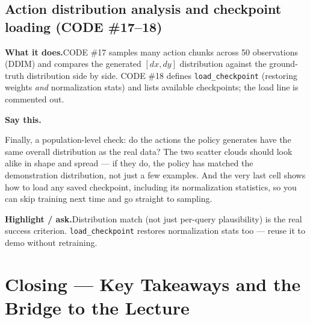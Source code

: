 \documentclass[11pt]{article}
\newenvironment{saythis}{%
  \par\smallskip\noindent
  \begin{list}{}{%
    \setlength{\leftmargin}{1.2em}%
    \setlength{\rightmargin}{0.5em}%
    \setlength{\topsep}{2pt}%
  }\item\relax
  \color{sayrule}\textbf{Say this.}\hspace{0.4em}\color{black}\itshape
}{%
  \end{list}\par\smallskip
}
\newcommand{\highlight}[1]{\par\smallskip\noindent\textcolor{hlcolor}{\textbf{Highlight / ask.}}\hspace{0.4em}#1\par\smallskip}
\newcommand{\whatdoes}[1]{\par\noindent\textbf{What it does.}\hspace{0.4em}#1\par}
\begin{document}
\subsection{Action distribution analysis and checkpoint loading (CODE \#17--18)}
\whatdoes{CODE \#17 samples many action chunks across 50 observations (DDIM) and compares the generated
$[dx,dy]$ distribution against the ground-truth distribution side by side. CODE \#18 defines
\texttt{load\_checkpoint} (restoring weights \emph{and} normalization stats) and lists available
checkpoints; the load line is commented out.}
\begin{saythis}
Finally, a population-level check: do the actions the policy generates have the same overall distribution
as the real data? The two scatter clouds should look alike in shape and spread --- if they do, the policy
has matched the demonstration distribution, not just a few examples. And the very last cell shows how to
load any saved checkpoint, including its normalization statistics, so you can skip training next time and
go straight to sampling.
\end{saythis}
\highlight{Distribution match (not just per-query plausibility) is the real success criterion.
\texttt{load\_checkpoint} restores normalization stats too --- reuse it to demo without retraining.}

\section{Closing --- Key Takeaways and the Bridge to the Lecture}
\end{document}
